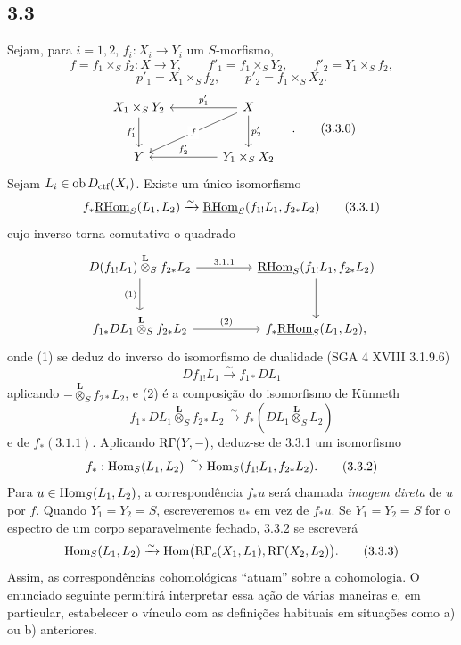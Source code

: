 \subsection*{3.3}
Sejam, para $i=1,2$, $f_i:X_i\to Y_i$ um $S$-morfismo,
\[
f=f_1\times_S f_2:X\to Y,
\qquad
f'_1=f_1\times_S Y_2,
\qquad
f'_2=Y_1\times_S f_2,
\]
\[
p'_1=X_1\times_S f_2,
\qquad
p'_2=f_1\times_S X_2.
\]
\begin{equation}
\begin{tikzcd}[column sep=3.8em,row sep=2.4em]
X_1\times_S Y_2 \arrow[d,"f'_1"'] & X \arrow[l,"p'_1"'] \arrow[dl,"f" description] \arrow[d,"p'_2"] \\
Y & Y_1\times_S X_2 \arrow[l,"f'_2"']
\end{tikzcd}\quad .
\tag{3.3.0}
\end{equation}
Sejam $L_i\in\operatorname{ob}D_{\mathrm{ctf}}(X_i)$. Existe um único isomorfismo
\begin{equation}
f_*\underline{\mathrm{RHom}}_S(L_1,L_2)
\xrightarrow{\sim}
\underline{\mathrm{RHom}}_S(f_{1!}L_1,f_{2*}L_2)
\tag{3.3.1}
\end{equation}
cujo inverso torna comutativo o quadrado
\[
\begin{tikzcd}[column sep=4.5em,row sep=2.6em]
D(f_{1!}L_1)\overset{\mathbf L}{\otimes}_S f_{2*}L_2
  \arrow[r,"3.1.1"] \arrow[d,"(1)"']
& \uRHom_S(f_{1!}L_1,f_{2*}L_2) \arrow[d] \\
f_{1*}DL_1\overset{\mathbf L}{\otimes}_S f_{2*}L_2
  \arrow[r,"(2)"]
& f_*\uRHom_S(L_1,L_2),
\end{tikzcd}
\]
onde (1) se deduz do inverso do isomorfismo de dualidade (SGA 4 XVIII 3.1.9.6)
\[
Df_{1!}L_1\xrightarrow{\sim}f_{1*}DL_1
\]
aplicando $-\overset{\mathbf L}{\otimes}_S f_{2*}L_2$, e (2) é a composição do isomorfismo de Künneth
\[
f_{1*}DL_1\overset{\mathbf L}{\otimes}_S f_{2*}L_2
\xrightarrow{\sim}
f_*(DL_1\overset{\mathbf L}{\otimes}_S L_2)
\]
e de $f_*(3.1.1)$. Aplicando $\mathrm{R}\Gamma(Y,-)$, deduz-se de 3.3.1 um isomorfismo
\begin{equation}
f_*:\operatorname{Hom}_S(L_1,L_2)
\xrightarrow{\sim}
\operatorname{Hom}_S(f_{1!}L_1,f_{2*}L_2).
\tag{3.3.2}
\end{equation}
Para $u\in\operatorname{Hom}_S(L_1,L_2)$, a correspondência $f_*u$ será chamada \emph{imagem direta} de $u$ por $f$. Quando $Y_1=Y_2=S$, escreveremos $u_*$ em vez de $f_*u$. Se $Y_1=Y_2=S$ for o espectro de um corpo separavelmente fechado, 3.3.2 se escreverá
\begin{equation}
\operatorname{Hom}_S(L_1,L_2)
\xrightarrow{\sim}
\operatorname{Hom}\bigl(\mathrm{R}\Gamma_c(X_1,L_1),\mathrm{R}\Gamma(X_2,L_2)\bigr).
\tag{3.3.3}
\end{equation}
Assim, as correspondências cohomológicas ``atuam'' sobre a cohomologia. O enunciado seguinte permitirá interpretar essa ação de várias maneiras e, em particular, estabelecer o vínculo com as definições habituais em situações como a) ou b) anteriores.

